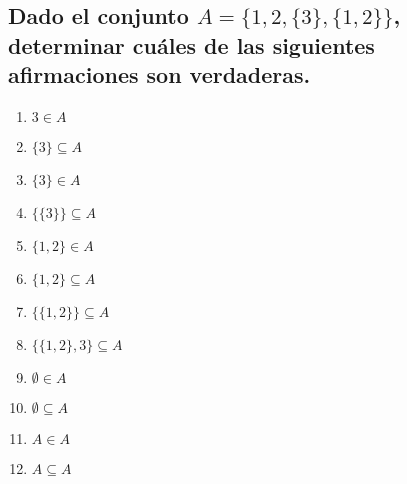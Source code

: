 \documentclass{article}
\begin{document}
\subsection{Dado el conjunto $A = \{1, 2, \{3\}, \{1,2\}\}$, determinar cuáles de las siguientes afirmaciones son verdaderas.}

\begin{multicols}{2}
\begin{enumerate}[label=\roman*)]
    \item $3 \in A$
    \item $\{3\} \subseteq A$
    \item $\{3\} \in A$
    \item $\{\{3\}\} \subseteq A$
    \item $\{1,2\} \in A$
    \item $\{1,2\} \subseteq A$
    \item $\{\{1,2\}\} \subseteq A$
    \item $\{\{1,2\}, 3\} \subseteq A$
    \item $\emptyset \in A$
    \item $\emptyset \subseteq A$
    \item $A \in A$
    \item $A \subseteq A$
\end{enumerate}
\end{multicols}
\end{document}
